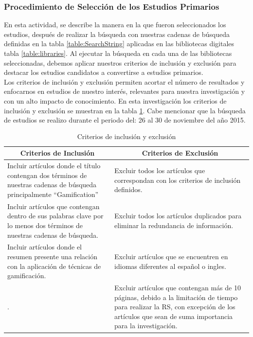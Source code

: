 \documentclass{report}
\begin{document}
            \subsubsection{Procedimiento de Selección de los Estudios Primarios}
    
	        En esta actividad, se describe la manera en la que fueron seleccionados los estudios, después de realizar la búsqueda con nuestras cadenas de búsqueda definidas en la tabla \ref{table:SearchString} aplicadas en las bibliotecas digitales tabla \ref{table:libraries}. Al ejecutar la búsqueda en cada una de las bibliotecas seleccionadas, debemos aplicar nuestros criterios de inclusión y exclusión para destacar los estudios candidatos a convertirse a estudios primarios.\\
    	    Los criterios de inclusión y exclusión permiten acortar el número de resultados y enfocarnos en estudios de nuestro interés, relevantes para nuestra investigación y con un alto impacto de conocimiento. En esta investigación los criterios de inclusión y exclusión se muestran en la tabla \ref{table:criterios}. Cabe mencionar que la búsqueda de estudios se realizo durante el periodo del: 26 al 30 de noviembre del año 2015.\\
        	\begin{table}
                \begin{center}
                    \caption{Criterios de inclusión y exclusión}
                    \label{table:criterios}
                    \begin{tabular}{| p{7cm} | p{7cm} |}
                        \toprule
                        \hline
                        \multicolumn{1}{|c|}{\textbf{Criterios de Inclusión}} & \multicolumn{1}{|c|}{\textbf{Criterios de Exclusión}} \\
                        \hline
                        Incluir artículos donde el título contengan dos términos de nuestras cadenas de búsqueda principalmente ``Gamification''{ }& Excluir todos los artículos que correspondan con los criterios de inclusión definidos.\\
                        \hline
                        Incluir artículos que contengan dentro de sus palabras clave por lo menos dos términos de nuestras cadenas de búsqueda. & Excluir todos los artículos duplicados para eliminar la redundancia de información.\\
                        \hline
                        Incluir artículos donde el resumen presente una relación con la aplicación de técnicas de gamificación. & Excluir artículos que se encuentren en idiomas diferentes al español o ingles.\\
                        \hline
                        . & Excluir artículos que contengan más de 10 páginas, debido a la limitación de tiempo para realizar la RS, con excepción de los artículos que sean de suma importancia para la investigación.\\
                        \hline
                    \end{tabular}
                \end{center}
            \end{table}
\end{document}
